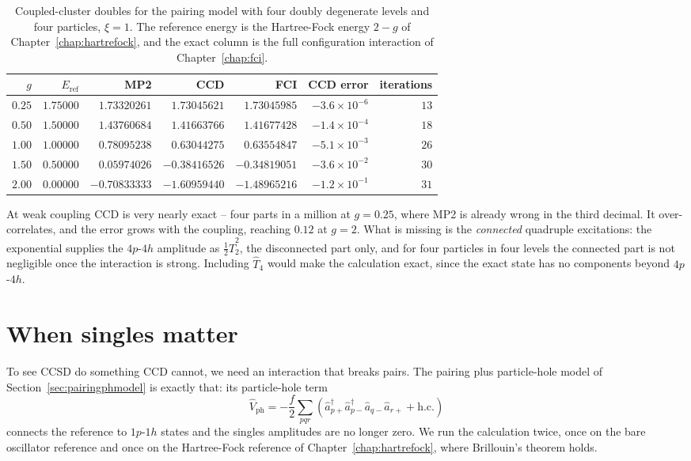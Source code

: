 \begin{table}[h]
\centering
\renewcommand{\arraystretch}{1.25}
\setlength{\tabcolsep}{7pt}
\small
\begin{tabular}{rrrrrrr}
\toprule
$g$ & $E_{\mathrm{ref}}$ & MP2 & CCD & FCI & CCD error & iterations\\
\midrule
$0.25$ & $1.75000$ & $1.73320261$ & $1.73045621$ & $1.73045985$
  & $-3.6\times10^{-6}$ & $13$\\
$0.50$ & $1.50000$ & $1.43760684$ & $1.41663766$ & $1.41677428$
  & $-1.4\times10^{-4}$ & $18$\\
$1.00$ & $1.00000$ & $0.78095238$ & $0.63044275$ & $0.63554847$
  & $-5.1\times10^{-3}$ & $26$\\
$1.50$ & $0.50000$ & $0.05974026$ & $-0.38416526$ & $-0.34819051$
  & $-3.6\times10^{-2}$ & $30$\\
$2.00$ & $0.00000$ & $-0.70833333$ & $-1.60959440$ & $-1.48965216$
  & $-1.2\times10^{-1}$ & $31$\\
\bottomrule
\end{tabular}
\caption{Coupled-cluster doubles for the pairing model with four doubly
degenerate levels and four particles, $\xi=1$.  The reference energy is the
Hartree-Fock energy $2-g$ of Chapter~\ref{chap:hartrefock}, and the exact
column is the full configuration interaction of Chapter~\ref{chap:fci}.}
\label{tab:ccdpairing}
\end{table}

At weak coupling CCD is very nearly exact -- four parts in a million at
$g=0.25$, where MP2 is already wrong in the third decimal.  It
over-correlates, and the error grows with the coupling, reaching $0.12$ at
$g=2$.  What is missing is the \emph{connected} quadruple excitations: the
exponential supplies the $4p$-$4h$ amplitude as $\tfrac12\hat{T}_2^2$, the
disconnected part only, and for four particles in four levels the connected
part is not negligible once the interaction is strong.  Including $\hat{T}_4$
would make the calculation exact, since the exact state has no components
beyond $4p$-$4h$.

\section{When singles matter}
\label{sec:ccsinglesmatter}

To see CCSD do something CCD cannot, we need an interaction that breaks
pairs.  The pairing plus particle-hole model of
Section~\ref{sec:pairingphmodel} is exactly that: its particle-hole term
\begin{equation}
  \hat{V}_{\mathrm{ph}} = -\frac{f}{2}\sum_{pqr}
    \left(\hat{a}^{\dagger}_{p+}\hat{a}^{\dagger}_{p-}
      \hat{a}_{q-}\hat{a}_{r+} + \mathrm{h.c.}\right)
  \label{eq:10-phterm}
\end{equation}
connects the reference to $1p$-$1h$ states and the singles amplitudes are no
longer zero.  We run the calculation twice, once on the bare oscillator
reference and once on the Hartree-Fock reference of
Chapter~\ref{chap:hartrefock}, where Brillouin's theorem holds.

